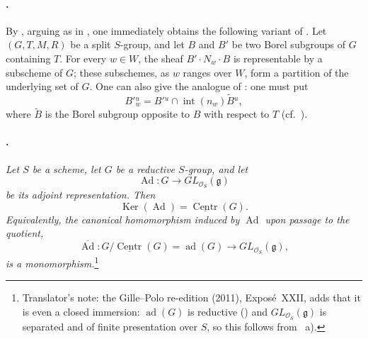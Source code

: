 \paragraph{.}
By  \textup{}, arguing as in , one immediately
obtains the following variant of . Let \((G,T,M,R)\) be a
split \(S\)-group, and let \(B\) and \(B'\) be two Borel subgroups
of \(G\) containing \(T\). For every \(w\in W\), the sheaf
\(B'\cdot N_w\cdot B\) is representable by a subscheme of \(G\);
these subschemes, as \(w\) ranges over \(W\), form a partition of
the underlying set of \(G\). One can also give the analogue of
 \textup{}: one must put
\[
  B'{}^u_w
  =
  B'{}^u\cap\operatorname{int}(n_w)\widetilde B{}^u,
\]
where \(\widetilde B\) is the Borel subgroup opposite to \(B\) with
respect to \(T\) \textup{(cf.\ )}.

\paragraph{.}
\textit{Let \(S\) be a scheme, let \(G\) be a reductive
\(S\)-group, and let}
\[
  \operatorname{Ad}\colon
  G\longrightarrow GL_{\mathcal O_S}(\mathfrak g)
\]
\textit{be its adjoint representation. Then}
\[
  \operatorname{Ker}(\operatorname{Ad})
  =
  \underline{\operatorname{Centr}}(G).
\]
\textit{Equivalently, the canonical homomorphism induced by
\(\operatorname{Ad}\) upon passage to the quotient,}
\[
  \overline{\operatorname{Ad}}\colon
  G/\underline{\operatorname{Centr}}(G)
  =
  \operatorname{ad}(G)
  \longrightarrow
  GL_{\mathcal O_S}(\mathfrak g),
\]
\textit{is a monomorphism.}\footnote{Translator's note: the Gille--Polo re-edition (2011), Exposé~XXII,
adds that it is even a closed immersion: \(\operatorname{ad}(G)\) is reductive
() and \(GL_{\mathcal O_S}(\mathfrak g)\) is separated and of finite presentation
over \(S\), so this follows from ~a).}

